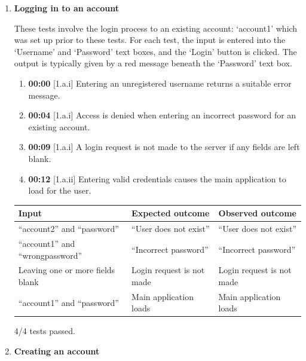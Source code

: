 \documentclass{article}
\begin{document}
\begin{enumerate}

    \item \textbf{Logging in to an account}
    
    These tests involve the login process to an existing account: `account1' which was set up prior to these tests. For each test, the input is entered into the `Username' and `Password' text boxes, and the `Login' button is clicked. The output is typically given by a red message beneath the `Password' text box.
    
    \begin{enumerate}
        \item \textbf{00:00} [1.a.i] Entering an unregistered username returns a suitable error message.
        \item \textbf{00:04} [1.a.i] Access is denied when entering an incorrect password for an existing account.
        \item \textbf{00:09} [1.a.i] A login request is not made to the server if any fields are left blank.
        \item \textbf{00:12} [1.a.ii] Entering valid credentials causes the main application to load for the user.
     \end{enumerate}

    \begin{table}[H]
    \centering
        \begin{tabularx}{\textwidth}{|L|L|L|}
        \hline
        \textbf{Input} & \textbf{Expected outcome} & \textbf{Observed outcome} \\\hline
        ``account2'' and ``password'' & ``User does not exist'' & ``User does not exist'' \\\hline
        ``account1'' and ``wrongpassword'' & ``Incorrect password'' & ``Incorrect password'' \\\hline
        Leaving one or more fields blank & Login request is not made & Login request is not made \\\hline
        ``account1'' and ``password'' & Main application loads & Main application loads \\\hline
        \end{tabularx}
    \end{table}

    4/4 tests passed. \\

    \item \textbf{Creating an account}
    

\end{enumerate}
\end{document}
